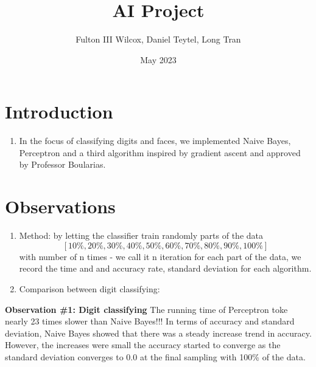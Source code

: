 \documentclass{article}
\title{AI Project}
\author{Fulton III Wilcox, Daniel Teytel, Long Tran}
\date{May 2023}
\begin{document}
\maketitle

\section{Introduction}
\begin{enumerate}
    \item[] In the focus of classifying digits and faces, we implemented Naive Bayes, Perceptron and a third algorithm inspired by gradient ascent and approved by Professor Boularias.
\end{enumerate}

\section{Observations}
\begin{enumerate}
    \item[] Method: by letting the classifier train randomly parts of the data \[[10\%, 20\%, 30\%, 40\%, 50\%, 60\%, 70\%, 80\%, 90\%, 100\%]\]with number of n times - we call it n iteration for each part of the data, we record the time and and accuracy rate, standard deviation for each algorithm.

    \item[] Comparison between digit classifying:
\end{enumerate}













\textbf{Observation \#1: Digit classifying}
The running time of Perceptron toke nearly 23 times slower than Naive Bayes!!! In terms of accuracy and standard deviation, Naive Bayes showed that there was a steady increase trend in accuracy. However, the increases were small the accuracy started to converge as the standard deviation converges to 0.0 at the final sampling with 100\% of the data.
\end{document}
